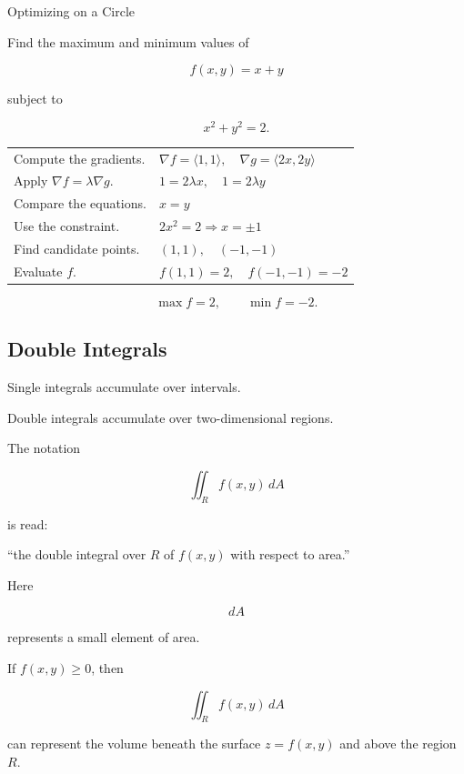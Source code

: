 \begin{workedexamplebox}{Optimizing on a Circle}

Find the maximum and minimum values of

\[ f(x,y)=x+y \]

subject to

\[ x^2+y^2=2. \]

\begin{tabularx}{\textwidth}{@{}>{\raggedright\arraybackslash}p{}X@{}}
Compute the gradients. &
\(\nabla f=\langle1,1\rangle,\quad
\nabla g=\langle2x,2y\rangle\)\\
Apply \(\nabla f=\lambda\nabla g\). &
\(1=2\lambda x,\quad1=2\lambda y\)\\
Compare the equations. &
\(x=y\)\\
Use the constraint. &
\(2x^2=2\Rightarrow x=\pm1\)\\
Find candidate points. &
\((1,1),\quad(-1,-1)\)\\
Evaluate \(f\). &
\(f(1,1)=2,\quad f(-1,-1)=-2\)
\end{tabularx}

\begin{answerbox}
\[ \boxed{\max f=2,\qquad \min f=-2.} \]
\end{answerbox}
\end{workedexamplebox}

\subsection{Double Integrals}
\label{subsec:double-integrals}

Single integrals accumulate over intervals.

Double integrals accumulate over two-dimensional regions.

The notation

\[ \iint_R f(x,y)\,dA \]

is read:

``the double integral over \(R\) of \(f(x,y)\) with respect to area.''

Here

\[ dA \]

represents a small element of area.

If \(f(x,y)\geq0\), then

\[ \iint_R f(x,y)\,dA \]

can represent the volume beneath the surface \(z=f(x,y)\) and above the
region \(R\).

